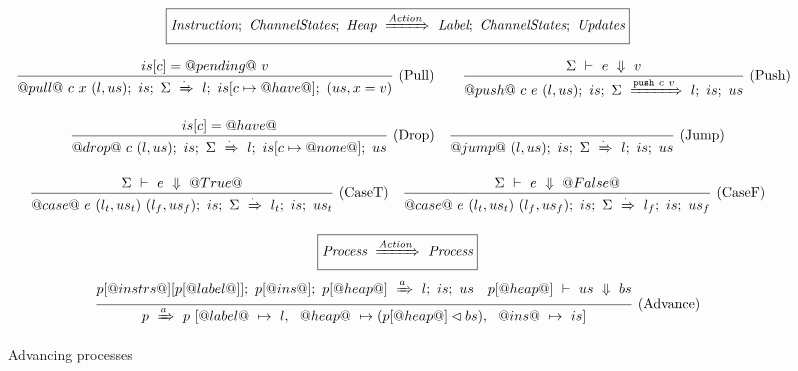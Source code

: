 
\begin{figure*}
\begin{minipage}[t]{1\textwidth}

$$
  \boxed{
    \textit{Instruction};~\textit{ChannelStates};~\textit{Heap}~\xRightarrow{\textit{Action}}~\textit{Label};~\textit{ChannelStates};~\textit{Updates}
  }
$$

$$
\ruleIN{
  is[c] = @pending@~v
}{
  \ProcBlockShake
        {@pull@~c~x~(l,us)}
        {is}
        {\Sigma}
        {\cdot}
        {l}
        {is[c \mapsto @have@]}
        {(us, x = v)}
}{Pull}
%
\quad
%
\ruleIN{
  \ExpEval{\Sigma}{e}{v}
}{
  \ProcBlockShake
        {@push@~c~e~(l,us)}
        {is}
        {\Sigma}
        {\Push~c~v}
        {l}
        {is}
        {us}
}{Push}
$$

$$
\enskip \frac {\displaystyle 
  is[c] = @have@
} {\displaystyle 
  @drop@~c~(l,us);~is;~\Sigma~\xRightarrow{\cdot}~l;~is[c \mapsto @none@];~us
} \  \mbox{(Drop)} \enskip
\enskip \frac {\displaystyle 
} {\displaystyle 
  @jump@~(l,us);~is;~\Sigma~\xRightarrow{\cdot}~l;~is;~us
} \  \mbox{(Jump)} \enskip
$$

$$
\enskip \frac {\displaystyle 
  \Sigma~\vdash~e~\Downarrow~@True@
} {\displaystyle 
  @case@~e~(l_t,us_t)~(l_f,us_f);~is;~\Sigma~\xRightarrow{\cdot}~l_t;~is;~us_t
} \  \mbox{(CaseT)} \enskip
\enskip \frac {\displaystyle 
  \Sigma~\vdash~e~\Downarrow~@False@
} {\displaystyle 
  @case@~e~(l_t,us_t)~(l_f,us_f);~is;~\Sigma~\xRightarrow{\cdot}~l_f;~is;~us_f
} \  \mbox{(CaseF)} \enskip
$$

\vspace{2em}

$$
  \boxed{\textit{Process}~\xRightarrow{\textit{Action}}~\textit{Process}}
$$
$$
\enskip \frac {\displaystyle 
  p[@instrs@][p[@label@]];~p[@ins@];~p[@heap@]~\xRightarrow{a}~l;~is;~us
  \quad
    p[@heap@]~\vdash~us~\Downarrow~bs
} {\displaystyle 
  p~\xRightarrow{a}~p~[    @label@~ \mapsto ~l
           , ~~ @heap@~  \mapsto (p[@heap@] \lhd bs)
           , ~~ @ins@~   \mapsto ~is]
} \  \mbox{(Advance)} \enskip
$$


\end{minipage}
\caption{Advancing processes}

\label{fig:Process:Eval:Shake}
\end{figure*}

